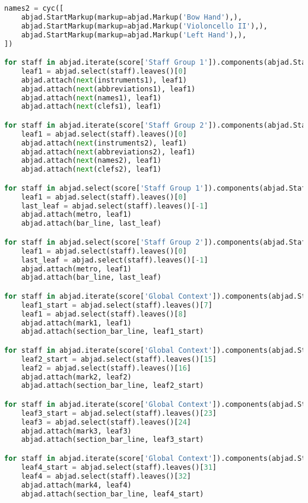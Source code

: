 \begin{lstlisting}[language=Python, caption=Cthar Segment\_I]
names2 = cyc([
    abjad.StartMarkup(markup=abjad.Markup('Bow Hand'),),
    abjad.StartMarkup(markup=abjad.Markup('Violoncello II'),),
    abjad.StartMarkup(markup=abjad.Markup('Left Hand'),),
])

for staff in abjad.iterate(score['Staff Group 1']).components(abjad.Staff):
    leaf1 = abjad.select(staff).leaves()[0]
    abjad.attach(next(instruments1), leaf1)
    abjad.attach(next(abbreviations1), leaf1)
    abjad.attach(next(names1), leaf1)
    abjad.attach(next(clefs1), leaf1)

for staff in abjad.iterate(score['Staff Group 2']).components(abjad.Staff):
    leaf1 = abjad.select(staff).leaves()[0]
    abjad.attach(next(instruments2), leaf1)
    abjad.attach(next(abbreviations2), leaf1)
    abjad.attach(next(names2), leaf1)
    abjad.attach(next(clefs2), leaf1)

for staff in abjad.select(score['Staff Group 1']).components(abjad.Staff)[0]:
    leaf1 = abjad.select(staff).leaves()[0]
    last_leaf = abjad.select(staff).leaves()[-1]
    abjad.attach(metro, leaf1)
    abjad.attach(bar_line, last_leaf)

for staff in abjad.select(score['Staff Group 2']).components(abjad.Staff)[0]:
    leaf1 = abjad.select(staff).leaves()[0]
    last_leaf = abjad.select(staff).leaves()[-1]
    abjad.attach(metro, leaf1)
    abjad.attach(bar_line, last_leaf)

for staff in abjad.iterate(score['Global Context']).components(abjad.Staff):
    leaf1_start = abjad.select(staff).leaves()[7]
    leaf1 = abjad.select(staff).leaves()[8]
    abjad.attach(mark1, leaf1)
    abjad.attach(section_bar_line, leaf1_start)

for staff in abjad.iterate(score['Global Context']).components(abjad.Staff):
    leaf2_start = abjad.select(staff).leaves()[15]
    leaf2 = abjad.select(staff).leaves()[16]
    abjad.attach(mark2, leaf2)
    abjad.attach(section_bar_line, leaf2_start)

for staff in abjad.iterate(score['Global Context']).components(abjad.Staff):
    leaf3_start = abjad.select(staff).leaves()[23]
    leaf3 = abjad.select(staff).leaves()[24]
    abjad.attach(mark3, leaf3)
    abjad.attach(section_bar_line, leaf3_start)

for staff in abjad.iterate(score['Global Context']).components(abjad.Staff):
    leaf4_start = abjad.select(staff).leaves()[31]
    leaf4 = abjad.select(staff).leaves()[32]
    abjad.attach(mark4, leaf4)
    abjad.attach(section_bar_line, leaf4_start)


\end{lstlisting}
